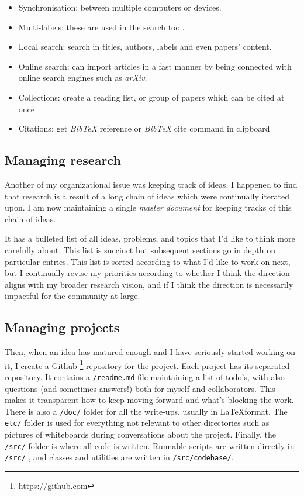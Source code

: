 \begin{itemize}
\item Synchronisation: between multiple computers or devices.
\item Multi-labels: these are used in the search tool.
\item Local search: search in titles, authors, labels and even papers' content.
\item Online search: can import articles in a fast manner by being connected with online search engines such as \emph{arXiv}.
\item Collections: create a reading list, or group of papers which can be cited at once
\item Citations: get \emph{BibTeX} reference or \emph{BibTeX} cite command in clipboard
\end{itemize}

\subsection{Managing research}
Another of my organizational issue was keeping track of ideas.
I happened to find that research is a result of a long chain of ideas which were continually iterated upon.
I am now maintaining a single \textit{master document} for keeping tracks of this chain of ideas.

It has a bulleted list of all ideas, problems, and topics that I’d like to think more carefully about. This list is succinct but subsequent sections go in depth on particular entries.
This list is sorted according to what I’d like to work on next, but I continually revise my priorities according to whether I think the direction aligns with my broader research vision, and if I think the direction is necessarily impactful for the community at large.

\subsection{Managing projects}
Then, when an idea has matured enough and I have seriously started working on it, I create a Github \footnote{\url{https://github.com}} repository for the project. Each project has its separated repository. 
It contains a \texttt{/readme.md} file maintaining a list of todo’s, with also questions (and sometimes answers!) both for myself and collaborators. This makes it transparent how to keep moving forward and what’s blocking the work.
There is also a \texttt{/doc/} folder for all the write-ups, usually in \LaTeX  format.
The  \texttt{etc/} folder is used for everything not relevant to other directories such as pictures of whiteboards during conversations about the project.
Finally, the \texttt{/src/} folder is where all code is written. Runnable scripts are written directly in \texttt{/src/} , and classes and utilities are written in \texttt{/src/codebase/}.


